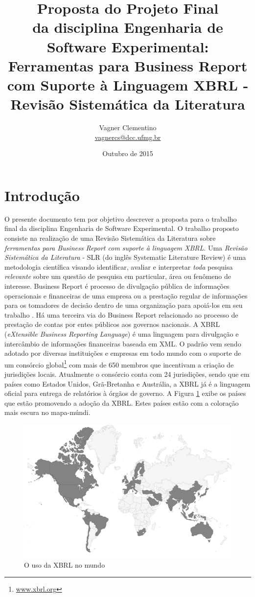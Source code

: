 \documentclass{article}
\title{Proposta do Projeto Final \\
       da disciplina Engenharia de Software Experimental: \\
Ferramentas para Business Report com Suporte à Linguagem XBRL - Revisão
Sistemática da Literatura
}
\author{Vagner Clementino \\ 
       \url{vagnercs@dcc.ufmg.br}}
\date{Outubro de  2015}
\begin{document}
\maketitle

\section{Introdução}
\label{sec:intro}

O presente documento tem por objetivo descrever a proposta para o
trabalho final da disciplina Engenharia de Software Experimental. O
trabalho proposto consiste na realização de uma Revisão Sistemática da
Literatura sobre \textit{ferramentas para Business Report com suporte à linguagem XBRL}. Uma \textit{Revisão Sistemática da Literatura} - SLR (do inglês Systematic Literature Review) é uma
metodologia científica visando identificar, avaliar e interpretar
\textit{toda} pesquisa \textit{relevante} sobre um questão de pesquisa
em particular, área ou fenômeno de interesse\cite{keele2007guidelines,wohlin2012experimentation}. Business Report é processo de  divulgação
pública de informações operacionais e financeiras de uma empresa  ou a
prestação regular de informações para os tomadores de decisão dentro
de uma organização para apoiá-los em seu trabalho
\cite{lymer1999business}. Há uma terceira via do Business Report
relacionado ao processo de prestação de contas por entes públicos aos
governos nacionais. A XBRL (\textit{eXtensible Business Reporting
  Language}) é uma linguagem para divulgação e intercâmbio de
informações financeiras baseada em
XML\cite{xbrl_conceitos_aplicacoes}. O padrão vem sendo adotado por
diversas instituições e empresas em todo mundo com o suporte de um
consórcio global\footnote{\url{www.xbrl.org}} com mais de 650 membros
que incentivam a criação de jurisdições locais. Atualmente o consórcio
conta com 24 jurisdições, sendo que em países como  Estados Unidos,
Grã-Bretanha e Austrália, a XBRL já é a linguagem oficial para entrega
de relatórios à órgãos de governo. A Figura \ref{fig:world_map} exibe
os países que estão promovendo a adoção da XBRL. Estes países estão
com a coloração mais escura no mapa-múndi.

\begin{figure}[hbtp]
\centering
\includegraphics[width=.75\textwidth]{../img/world-map.png}
\caption{O uso da XBRL no mundo}
\label{fig:world_map}
\end{figure}
\end{document}

